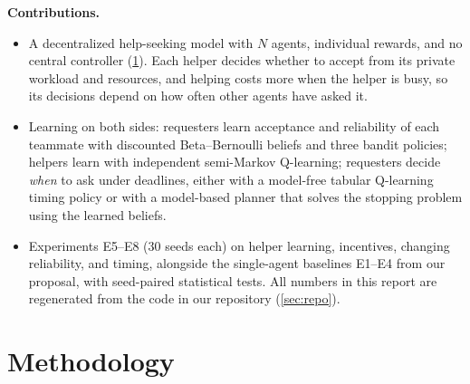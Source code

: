 \documentclass{article}
\begin{document}
\textbf{Contributions.}
\begin{itemize}[leftmargin=*]
  \item A decentralized help-seeking model with $N$ agents, individual rewards, and no central controller (\cref{sec:model}). Each helper decides whether to accept from its private workload and resources, and helping costs more when the helper is busy, so its decisions depend on how often other agents have asked it.
  \item Learning on both sides: requesters learn acceptance and reliability of each teammate with discounted Beta--Bernoulli beliefs and three bandit policies; helpers learn with independent semi-Markov Q-learning; requesters decide \emph{when} to ask under deadlines, either with a model-free tabular Q-learning timing policy or with a model-based planner that solves the stopping problem using the learned beliefs.
  \item Experiments E5--E8 (30 seeds each) on helper learning, incentives, changing reliability, and timing, alongside the single-agent baselines E1--E4 from our proposal, with seed-paired statistical tests. All numbers in this report are regenerated from the code in our repository (\cref{sec:repo}).
\end{itemize}

\section{Methodology}\label{sec:model}
\end{document}
